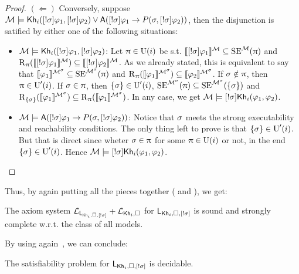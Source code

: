 \begin{proof}
$(\Leftarrow)$ Conversely, suppose $\modults \models \khi(\srefbox{\plan} \varphi_1,\srefbox{\plan} \varphi_2) \vee \A(\srefbox{\plan} \varphi_1 \ra P(\plan,\srefbox{\plan}\varphi_2))$, then the disjunction is satified by either one of the following situations:
\begin{itemize}
\item  $\modults \models \khi(\srefbox{\plan} \varphi_1,\srefbox{\plan} \varphi_2)$: Let $\plans \in \Unc(i)$ be s.t. $\truthset{\modults}{\srefbox{\plan}\varphi_1} \subseteq \stexec^\modults(\plans)$ and $\R_\plans(\truthset{\modults}{\srefbox{\plan}\varphi_1}) \subseteq \truthset{\modults}{\srefbox{\plan}\varphi_2}$.
As we already stated, this is equivalent to say that $\truthset{\modults^\plan}{\varphi_1} \subseteq \stexec^{\modults^\plan}(\plans)$ and $\R_\plans(\truthset{\modults^\plan}{\varphi_1}) \subseteq \truthset{\modults^\plan}{\varphi_2}$.
If $\plan \notin \plans$, then $\plans \in \Unc'(i)$.
If $\plan \in \plans$, then $\set{\plan} \in \Unc'(i)$, $\stexec^{\modults^\plan}(\plans) \subseteq \stexec^{\modults^\plan}(\set{\plan})$ and $\R_{\set{\plan}}(\truthset{\modults^\plan}{\varphi_1}) \subseteq \R_\plans(\truthset{\modults^\plan}{\varphi_1})$. In any case, we get $\modults \models \srefbox{\plan}\khi(\varphi_1,\varphi_2)$.

\item $\modults \models \A(\srefbox{\plan} \varphi_1 \ra P(\plan,\srefbox{\plan}\varphi_2))$: Notice that $\plan$ meets the strong executability and reachability conditions.
The only thing left to prove is that $\set{\plan} \in \Unc'(i)$. But that is direct since wheter $\plan \in \plans$ for some $\plans \in \Unc(i)$ or not, in the end $\set{\plan} \in \Unc'(i)$. Hence $\modults \models \srefbox{\plan}\khi(\varphi_1,\varphi_2)$.
\end{itemize}
\end{proof}

Thus, by again putting all the pieces together ( and ), we get:

\medskip 

\begin{theorem}
The axiom system $\axset_{\PlanReflogic}+\axset_{\khi,\square}$ for $\PlanReflogic$ is sound and strongly complete w.r.t. the class of all models.
\end{theorem}

\medskip 

By using again~, we can conclude:

\medskip 

\begin{corollary}
The satisfiability problem for $\PlanReflogic$ is decidable.
\end{corollary} 
